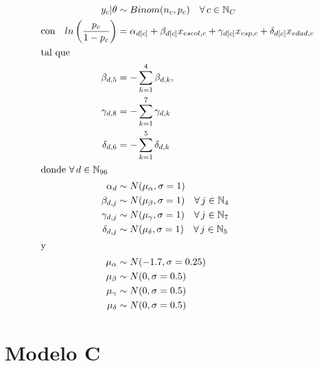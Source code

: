 \begin{align}\label{eq:Modelo_Comp_B}
y_c|\theta & \sim Binom(n_c,p_c) \quad \forall \, c \in \mathbb{N}_C \nonumber \\
\text{con} \quad ln\left(\dfrac{p_c}{1-p_c}\right) &= \alpha_{d[c]} + \beta_{d[c]} x_{escol,c} + \gamma_{d[c]} x_{csp,c} + \delta_{d[c]} x_{edad,c} \\ 
\intertext{tal que} 
\beta_{d,5} &= -\sum\limits_{k = 1}^{4} \beta_{d,k}, \nonumber \\
\gamma_{d,8} &= -\sum\limits_{k = 1}^{7} \gamma_{d,k} \nonumber \\
\delta_{d,6} &= -\sum\limits_{k = 1}^{5} \delta_{d,k} \nonumber \\
\intertext{donde $\forall \, d \in \mathbb{N}_{96}$}
\alpha_d & \sim N(\mu_{\alpha}, \sigma=1) \quad  \nonumber \\
\beta_{d,j} & \sim N(\mu_{\beta}, \sigma=1) \quad \forall \, j \in \mathbb{N}_{4} \nonumber \\
\gamma_{d,j} & \sim N(\mu_{\gamma}, \sigma=1) \quad \forall \, j \in \mathbb{N}_{7} \nonumber \\
\delta_{d,j} & \sim N(\mu_{\delta}, \sigma=1) \quad \forall \, j \in \mathbb{N}_{5} \nonumber \\
\intertext{y}
\mu_{\alpha} &\sim N(-1.7,\sigma=0.25) \nonumber \\
\mu_{\beta} &\sim N(0,\sigma=0.5) \nonumber \\
\mu_{\gamma} &\sim N(0,\sigma=0.5) \nonumber \\
\mu_{\delta} &\sim N(0,\sigma=0.5) \nonumber
\end{align}

\section{Modelo C}

